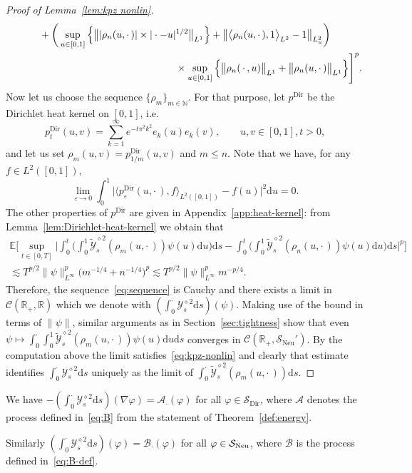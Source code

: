 \documentclass[AHL,Unicode,longabstracts]{cedram}
\DeclareMathOperator{\Dir}{Dir}
\DeclareMathOperator{\Neu}{Neu}
\newcommand{\bb}[1]{{\mathbb #1}}
\newcommand{\mc}[1]{{\mathcal #1}}
\renewcommand{\mc}[1]{{\mathcal #1}}
\newcommand{\Ctwo}{\ensuremath{\mc S_{\Dir}}}
\newcommand{\SN}{\ensuremath{\mc S_{\Neu}}}
\renewcommand{\leq}{\leqslant}
\newcommand*{\dd}{\mathrm{d}}
\newcommand*{\ds}{\dd s}
\newcommand*{\du}{\dd u}
\begin{document}
\begin{proof}[Proof of Lemma~\ref{lem:kpz nonlin}]
\begin{align*}
& \qquad \quad + \bigg(\sup_{u\in[0,1]} \Big\{ \big\| | \rho_n (u, \cdot\,) | \times | \cdot - u |^{1/2}\big\|_{L^1} \Big\} + \big\| \big\langle \rho_n (u, \cdot\,), 1 \big\rangle_{L^2} - 1 \big\|_{L^2_u} \bigg)\\
&\mkern 300mu \times \sup_{u\in[0,1]} \Big\{ \big\| \rho_n (\,\cdot\,, u) \big\|_{L^1} + \big\| \rho_n (u, \cdot\,)\big\|_{L^1} \Big\} \Bigg]^p.
\end{align*}
Now let us choose the sequence $\{\rho_m\}_{m \in \bb N}$. For that purpose, let $p^{\Dir}$ be the Dirichlet heat kernel on $[0, 1]$, i.e.
\begin{equation}\label{eq:dirker}
p^{\Dir}_t (u, v) = \sum_{k = 1}^{\infty} e^{- t \pi^2 k^2} e_k (u) e_k (v), \qquad u,v\in[0,1], t > 0,
\end{equation}
and let us set $\rho_m (u, v) = p^{\Dir}_{1 / m} (u, v) $ and $m \leq n$. Note that we have, for any $f \in L^2([0,1])$,
\[
\lim_{\varepsilon \to 0} \int_0^1 \big|\langle p_\varepsilon^{\Dir}(u,\cdot\,), f\rangle_{L^2([0,1])} - f(u)\big|^2 \du = 0.
\]
The other properties of $p^{\Dir}$ are given in Appendix~\ref{app:heat-kernel}: from Lemma~\ref{lem:Dirichlet-heat-kernel} we obtain that
\begin{multline*}
\!\mathbb{E} \bigg[\sup_{t \in [0, T]} \bigg| \int_0^t \bigg(\int_0^1
\widetilde{\mc Y}^{\diamond 2}_s (\rho_m (u, \cdot\,)) \psi (u) \du\bigg) \ds - \int_0^t \bigg(\int_0^1 \widetilde{\mc Y}^{\diamond 2}_s (\rho_n (u, \cdot\,)) \psi (u) \du \bigg) \ds \bigg|^p \bigg]\\
\lesssim T^{p / 2} \big\| \psi \big\|^p_{L^{\infty}} \big(m^{- 1 / 4} + n^{- 1 / 4}\big)^p \lesssim T^{p / 2} \big\| \psi \big\|^p_{L^{\infty}} m^{- p / 4}.\!
\end{multline*}
Therefore, the sequence~\eqref{eq:sequence} is Cauchy and there exists a limit in $\mc C (\mathbb{R}_+,
\bb R)$ which we denote with $(\int_0^{\cdot} \mc Y_s^{\diamond 2} \ds) (\psi)$. Making use of the bound in terms of $\|\psi\|$, similar arguments as in Section~\ref{sec:tightness} show that even $\psi \mapsto \int_0^\cdot \int_0^1\widetilde{\mc Y}_s^{\diamond 2}(\rho_m(u,\cdot\,))\psi(u)\du \ds$ converges in $\mc C (\mathbb{R}_+,\SN')$. By the computation above the limit satisfies~\eqref{eq:kpz-nonlin} and clearly that estimate identifies $\int_0^{\cdot} \mc Y_s^{\diamond 2} \ds$ uniquely as the limit of $\int_0^{\cdot} \widetilde{\mc Y}^{\diamond 2}_s (\rho_m (u, \cdot\,)) \ds$.
\end{proof}

\begin{coro}\label{cor:kpz-nonlin-A-B}
We have $- (\int_0^\cdot \mc Y^{\diamond 2}_s \ds)(\nabla \varphi) = \mc A_\cdot(\varphi)$ for all $\varphi \in \Ctwo$, where $\mc A$ denotes the process defined in~\eqref{eq:B} from the statement of Theorem~\ref{def:energy}.

Similarly $(\int_0^\cdot \mc Y^{\diamond 2}_s \ds)(\varphi) = \mc B_\cdot(\varphi)$ for all $\varphi \in \mc S_{\rm{Neu}}$, where $\mc B$ is the process defined in~\eqref{eq:B-def}.
\end{coro}
\end{document}
